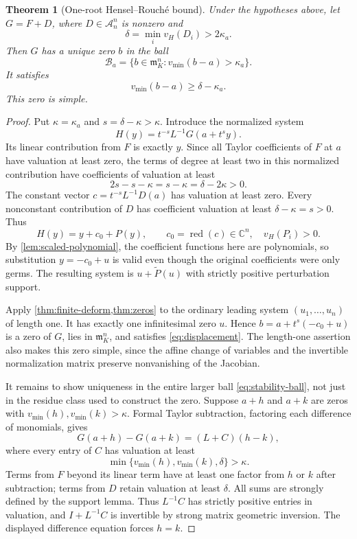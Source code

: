 \documentclass[11pt,letterpaper]{article}
\newtheorem{theorem}{Theorem}[section]
\theoremstyle{definition}
\theoremstyle{remark}
\newcommand{\C}{\mathbb C}
\newcommand{\A}{\mathscr A}
\newcommand{\m}{\mathfrak m}
\newcommand{\vH}{v_{\!H}}
\newcommand{\vmin}{v_{\min}}
\numberwithin{equation}{section}
\begin{document}
\begin{theorem}[One-root Hensel--Rouch\'e bound]\label{thm:local-stability}
Under the hypotheses above, let $G=F+D$, where $D\in\A_n^n$ is nonzero and
\[
 \delta=\min_i\vH(D_i)>2\kappa_a.
\]
Then $G$ has a unique zero $b$ in the ball
\begin{equation}\label{eq:stability-ball}
 \mathcal B_a=\{b\in\m_K^n:\vmin(b-a)>\kappa_a\}.
\end{equation}
It satisfies
\begin{equation}\label{eq:displacement}
 \vmin(b-a)\ge\delta-\kappa_a.
\end{equation}
This zero is simple.
\end{theorem}
\begin{proof}
Put $\kappa=\kappa_a$ and $s=\delta-\kappa>\kappa$. Introduce the normalized system
\[
 H(y)=t^{-s}L^{-1}G(a+t^sy).
\]
Its linear contribution from $F$ is exactly $y$. Since all Taylor coefficients of $F$ at $a$ have valuation at least zero, the terms of degree at least two in this normalized contribution have coefficients of valuation at least
\[
 2s-s-\kappa=s-\kappa=\delta-2\kappa>0.
\]
The constant vector $c=t^{-s}L^{-1}D(a)$ has valuation at least zero. Every nonconstant contribution of $D$ has coefficient valuation at least $\delta-\kappa=s>0$. Thus
\begin{equation}\label{eq:normalized-stability}
 H(y)=y+c_0+P(y),\qquad c_0=\operatorname{red}(c)\in\C^n,
 \quad\vH(P_i)>0.
\end{equation}
By \cref{lem:scaled-polynomial}, the coefficient functions here are polynomials, so substitution $y=-c_0+u$ is valid even though the original coefficients were only germs. The resulting system is $u+\widetilde P(u)$ with strictly positive perturbation support.

Apply \cref{thm:finite-deform,thm:zeros} to the ordinary leading system $(u_1,\ldots,u_n)$ of length one. It has exactly one infinitesimal zero $u$. Hence $b=a+t^s(-c_0+u)$ is a zero of $G$, lies in $\m_K^n$, and satisfies \eqref{eq:displacement}. The length-one assertion also makes this zero simple, since the affine change of variables and the invertible normalization matrix preserve nonvanishing of the Jacobian.

It remains to show uniqueness in the entire larger ball \eqref{eq:stability-ball}, not just in the residue class used to construct the zero. Suppose $a+h$ and $a+k$ are zeros with $\vmin(h),\vmin(k)>\kappa$. Formal Taylor subtraction, factoring each difference of monomials, gives
\[
 G(a+h)-G(a+k)=(L+C)(h-k),
\]
where every entry of $C$ has valuation at least
\[
 \min\{\vmin(h),\vmin(k),\delta\}>\kappa.
\]
Terms from $F$ beyond its linear term have at least one factor from $h$ or $k$ after subtraction; terms from $D$ retain valuation at least $\delta$. All sums are strongly defined by the support lemma. Thus $L^{-1}C$ has strictly positive entries in valuation, and $I+L^{-1}C$ is invertible by strong matrix geometric inversion. The displayed difference equation forces $h=k$.
\end{proof}
\end{document}

